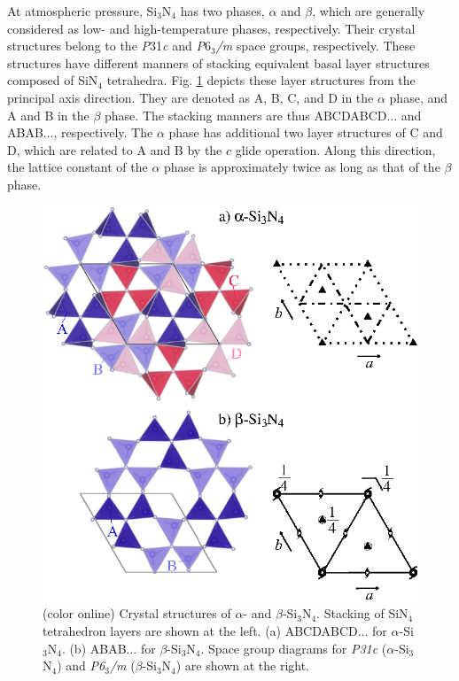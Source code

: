 \documentclass[twocolumn,amsmath,amssymb,a4paper,prb,superscriptaddress,floatfix]{revtex4-1}
\begin{document}
At atmospheric pressure, Si$_3$N$_4$ has two phases, $\alpha$ and $\beta$, which
are generally considered as low- and high-temperature phases,
respectively.\cite{zhou,hirosaki-md,riley} Their crystal structures belong to
the {\it P}31{\it c} and {\it P}6$_3${\it /m} space groups, respectively.\cite{yashima,boulay} These
structures have different manners of stacking equivalent basal layer structures
composed of SiN$_4$ tetrahedra.\cite{hampshire} Fig. \ref{fig:Fig1_cryst}
depicts these layer structures from the principal axis direction. They are
denoted as A, B, C, and D in the $\alpha$ phase, and A and B in the $\beta$
phase. The stacking manners are thus ABCDABCD... and ABAB..., respectively. The
$\alpha$ phase has additional two layer structures of C and D, which are related
to A and B by the $c$ glide operation.\cite{hampshire} Along this direction, the
lattice constant of the $\alpha$ phase is approximately twice as long as that of
the $\beta$ phase.
\begin{figure}[ht]
 \begin{center}
  \includegraphics[width=0.90\linewidth]{Fig1_crystal_str2.eps} \caption{(color
  online) Crystal structures of $\alpha$- and $\beta$-Si$_3$N$_4$. Stacking of
  SiN$_4$ tetrahedron layers are shown at the left. (a) ABCDABCD... for
  $\alpha$-Si$_3$N$_4$. (b) ABAB... for $\beta$-Si$_3$N$_4$.  Space group
  diagrams\cite{inttableA} for {\it P31c} ($\alpha$-Si$_3$N$_4$) and {\it
  P6$_3$/m} ($\beta$-Si$_3$N$_4$)
  are shown at the right.}
  \label{fig:Fig1_cryst} 
 \end{center}
\end{figure}
\end{document}

